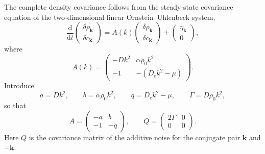 \documentclass{article}
\begin{document}
The complete density covariance follows from the steady-state covariance equation of the two-dimensional linear Ornstein--Uhlenbeck system,
\begin{equation}
    \frac{\mathrm d}{\mathrm dt}
    \begin{pmatrix}\delta\rho_{\mathbf k}\\ \delta c_{\mathbf k}\end{pmatrix}
    =A(k)\begin{pmatrix}\delta\rho_{\mathbf k}\\ \delta c_{\mathbf k}\end{pmatrix}
    +\begin{pmatrix}\eta_{\mathbf k}\\0\end{pmatrix},
\end{equation}
where
\begin{equation}
    A(k)=\begin{pmatrix}
        -Dk^2 & \alpha\rho_0k^2\\
        -1 & -(D_ck^2-\mu)
    \end{pmatrix}.
\end{equation}
Introduce
\begin{equation}
    a=Dk^2,
    \qquad b=\alpha\rho_0k^2,
    \qquad q=D_ck^2-\mu,
    \qquad \Gamma=D\rho_0k^2,
\end{equation}
so that
\begin{equation}
    A=\begin{pmatrix}-a&b\\-1&-q\end{pmatrix},
    \qquad
    Q=\begin{pmatrix}2\Gamma&0\\0&0\end{pmatrix}.
\end{equation}
Here $Q$ is the covariance matrix of the additive noise for the conjugate pair $\mathbf k$ and $-\mathbf k$.
\end{document}
